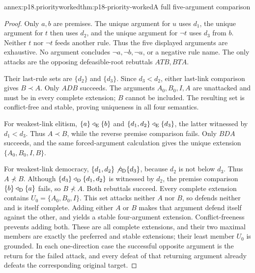 \begin{annexitem}{annex:p18.priorityworked}{thm:p18-priority-worked}{A full five-argument comparison}
\begin{proof}
Only \(a,b\) are premises. The unique argument for \(u\) uses \(d_1\),
the unique argument for \(t\) then uses \(d_2\), and the unique
argument for \(\neg t\) uses \(d_3\) from \(b\). Neither \(t\) nor
\(\neg t\) feeds another rule. Thus the five displayed arguments are exhaustive.
No argument concludes \(\neg a,\neg b,\neg u\), or a negative rule
name. The only attacks are the opposing defeasible-root rebuttals
\(A T B,B T A\).

Their last-rule sets are \(\{d_2\}\) and \(\{d_3\}\).
Since \(d_3<d_2\), either last-link comparison gives \(B\prec A\).
Only \(A D B\) succeeds.
The arguments \(A_0,B_0,I,A\) are unattacked and must be in every
complete extension; \(B\) cannot be included. The resulting set is
conflict-free and stable, proving uniqueness in all four semantics.

For weakest-link elitism,
\(\{a\}\triangleleft_{\rm E}\{b\}\) and
\(\{d_1,d_2\}\triangleleft_{\rm E}\{d_3\}\), the latter witnessed
by \(d_1<d_3\). Thus \(A\prec B\), while the reverse premise
comparison fails. Only \(B D A\) succeeds, and the same forced-argument
calculation gives the unique extension \(\{A_0,B_0,I,B\}\).

For weakest-link democracy,
\(\{d_1,d_2\}\not\triangleleft_{\rm D}\{d_3\}\), because \(d_2\)
is not below \(d_3\). Thus \(A\not\prec B\).
Although \(\{d_3\}\triangleleft_{\rm D}\{d_1,d_2\}\) is witnessed
by \(d_2\), the premise comparison \(\{b\}\triangleleft_{\rm D}\{a\}\)
fails, so \(B\not\prec A\).
Both rebuttals succeed.
Every complete extension contains \(U_0=\{A_0,B_0,I\}\).
This set attacks neither \(A\) nor \(B\), so defends neither and is
itself complete. Adding either \(A\) or \(B\) makes that argument
defend itself against the other, and yields a stable four-argument
extension. Conflict-freeness prevents adding both.
These are all complete extensions, and their two maximal members
are exactly the preferred and stable extensions; their least member
\(U_0\) is grounded.
In each one-direction case the successful opposite argument is the
return for the failed attack, and every defeat of that returning
argument already defeats the corresponding original target.
\end{proof}
\end{annexitem}
